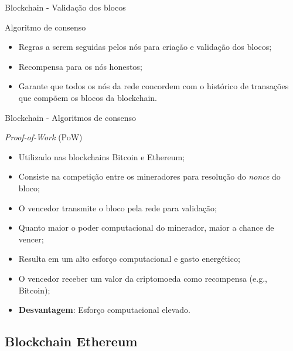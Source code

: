 \begin{frame}{Blockchain - Validação dos blocos}
    \begin{block}{Algoritmo de consenso}
    \begin{itemize}
        \item Regras a serem seguidas pelos nós para criação e validação dos blocos;
        \item Recompensa para os nós honestos;
        \item Garante que todos os nós da rede concordem com o histórico de transações que compõem os blocos da blockchain.
    \end{itemize}
    \end{block}    
\end{frame}

\begin{frame}{Blockchain - Algoritmos de consenso}
    \begin{exampleblock}{\textit{Proof-of-Work} (PoW)}
    \begin{itemize}
        \item Utilizado nas blockchains Bitcoin e Ethereum;
        \item Consiste na competição entre os mineradores para resolução do \textit{nonce} do bloco;
        \item O vencedor transmite o bloco pela rede para validação;
        \item Quanto maior o poder computacional do minerador, maior a chance de vencer;
        \item Resulta em um alto esforço computacional e gasto energético;
        \item O vencedor receber um valor da criptomoeda como recompensa (e.g., Bitcoin);
        \item \textbf{Desvantagem}: Esforço computacional elevado.
    \end{itemize}
    \end{exampleblock}
\end{frame}


\subsection{Blockchain Ethereum}


